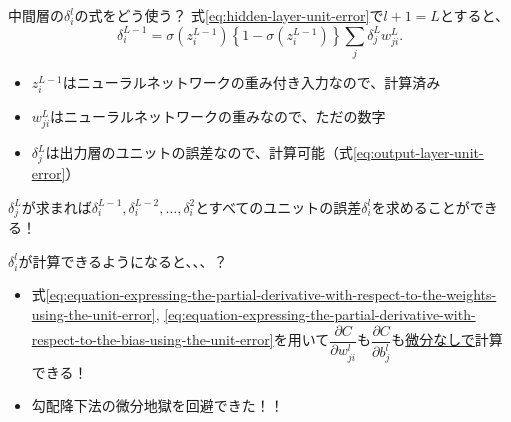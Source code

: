 \documentclass[dvipdfmx,aspectratio=169]{beamer}
\begin{document}
	\begin{frame}{中間層の$ \delta^l_i $の式をどう使う？}
		式\eqref{eq:hidden-layer-unit-error}で$ l+1 = L $とすると、
		\begin{equation*}
			\delta^{L-1}_i = \sigma(z^{L-1}_i)\left\lbrace 1 - \sigma(z^{L-1}_i) \right\rbrace \sum_j \delta^L_j w^L_{ji}.
		\end{equation*}
		\begin{itemize}
			\item $ z^{L-1}_i $はニューラルネットワークの重み付き入力なので、計算済み
			\item $ w^L_{ji} $はニューラルネットワークの重みなので、ただの数字
			\item $ \delta^L_j $は出力層のユニットの誤差なので、計算可能（式\eqref{eq:output-layer-unit-error}）
		\end{itemize}
		$ \delta^L_j $が求まれば$ \delta^{L-1}_i, \delta^{L-2}_i, \dots, \delta^2_i $とすべてのユニットの誤差$ \delta^l_i $を求めることができる！
	\end{frame}
	\begin{frame}{$ \delta^l_i $が計算できるようになると、、、？}
		\begin{itemize}
			\item 
				式\eqref{eq:equation-expressing-the-partial-derivative-with-respect-to-the-weights-using-the-unit-error}, \eqref{eq:equation-expressing-the-partial-derivative-with-respect-to-the-bias-using-the-unit-error}を用いて$ \dfrac{\partial C}{\partial w^l_{ji}} $も$ \dfrac{\partial C}{\partial b^l_j} $も\underline{微分なしで}計算できる！
			\item
				勾配降下法の微分地獄を回避できた！！
		\end{itemize}
	\end{frame}
\end{document}
